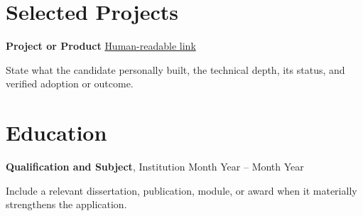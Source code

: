\documentclass[10pt,a4paper]{article}
\begin{document}
\section{Selected Projects}
\textbf{Project or Product} \hfill \href{https://example.com/}{Human-readable link}\par
State what the candidate personally built, the technical depth, its status, and verified adoption or outcome.

\section{Education}
\textbf{Qualification and Subject}, Institution \hfill Month Year -- Month Year\par
Include a relevant dissertation, publication, module, or award when it materially strengthens the application.
\end{document}
